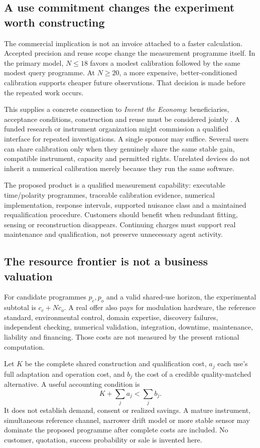 \documentclass[11pt,letterpaper]{article}
\theoremstyle{definition}\newtheorem{definition}[theorem]{Definition}
\theoremstyle{remark}\newtheorem{remark}[theorem]{Remark}
\begin{document}
\subsection{A use commitment changes the experiment worth constructing}
The commercial implication is not an invoice attached to a faster calculation. Accepted precision and reuse scope change the measurement programme itself. In the primary model, $N\le18$ favors a modest calibration followed by the same modest query programme. At $N\ge20$, a more expensive, better-conditioned calibration supports cheaper future observations. That decision is made before the repeated work occurs.

This supplies a concrete connection to \emph{Invent the Economy}: beneficiaries, acceptance conditions, construction and reuse must be considered jointly \cite{economy}. A funded research or instrument organization might commission a qualified interface for repeated investigations. A single sponsor may suffice. Several users can share calibration only when they genuinely share the same stable gain, compatible instrument, capacity and permitted rights. Unrelated devices do not inherit a numerical calibration merely because they run the same software.

The proposed product is a qualified measurement capability: executable time/polarity programmes, traceable calibration evidence, numerical implementation, response intervals, supported nuisance class and a maintained requalification procedure. Customers should benefit when redundant fitting, sensing or reconstruction disappears. Continuing charges must support real maintenance and qualification, not preserve unnecessary agent activity.

\subsection{The resource frontier is not a business valuation}
For candidate programmes $p_c,p_o$ and a valid shared-use horizon, the experimental subtotal is $c_c+Nc_o$. A real offer also pays for modulation hardware, the reference standard, environmental control, domain expertise, discovery failures, independent checking, numerical validation, integration, downtime, maintenance, liability and financing. Those costs are not measured by the present rational computation.

Let $K$ be the complete shared construction and qualification cost, $a_j$ each use's full adaptation and operation cost, and $b_j$ the cost of a credible quality-matched alternative. A useful accounting condition is
\begin{equation}
 K+\sum_j a_j<\sum_j b_j.
 \label{eq:economic}
\end{equation}
It does not establish demand, consent or realized savings. A mature instrument, simultaneous reference channel, narrower drift model or more stable sensor may dominate the proposed programme after complete costs are included. No customer, quotation, success probability or sale is invented here.
\end{document}
